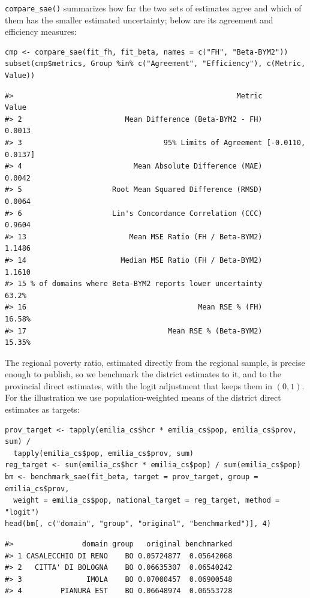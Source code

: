 \texttt{compare\_sae()} summarizes how far the two sets of estimates agree and which of them has the smaller estimated uncertainty; below are its agreement and efficiency measures:

\begin{verbatim}
cmp <- compare_sae(fit_fh, fit_beta, names = c("FH", "Beta-BYM2"))
subset(cmp$metrics, Group %in% c("Agreement", "Efficiency"), c(Metric, Value))
\end{verbatim}

\begin{verbatim}
#>                                                    Metric             Value
#> 2                        Mean Difference (Beta-BYM2 - FH)            0.0013
#> 3                                 95% Limits of Agreement [-0.0110, 0.0137]
#> 4                          Mean Absolute Difference (MAE)            0.0042
#> 5                     Root Mean Squared Difference (RMSD)            0.0064
#> 6                     Lin's Concordance Correlation (CCC)            0.9604
#> 13                        Mean MSE Ratio (FH / Beta-BYM2)            1.1486
#> 14                      Median MSE Ratio (FH / Beta-BYM2)            1.1610
#> 15 % of domains where Beta-BYM2 reports lower uncertainty             63.2%
#> 16                                        Mean RSE % (FH)            16.58%
#> 17                                 Mean RSE % (Beta-BYM2)            15.35%
\end{verbatim}

The regional poverty ratio, estimated directly from the regional sample, is precise enough to publish, so we benchmark the district estimates to it, and to the provincial direct estimates, with the logit adjustment that keeps them in \((0, 1)\). For the illustration we use population-weighted means of the district direct estimates as targets:

\begin{verbatim}
prov_target <- tapply(emilia_cs$hcr * emilia_cs$pop, emilia_cs$prov, sum) /
  tapply(emilia_cs$pop, emilia_cs$prov, sum)
reg_target <- sum(emilia_cs$hcr * emilia_cs$pop) / sum(emilia_cs$pop)
bm <- benchmark_sae(fit_beta, target = prov_target, group = emilia_cs$prov,
  weight = emilia_cs$pop, national_target = reg_target, method = "logit")
head(bm[, c("domain", "group", "original", "benchmarked")], 4)
\end{verbatim}

\begin{verbatim}
#>                domain group   original benchmarked
#> 1 CASALECCHIO DI RENO    BO 0.05724877  0.05642068
#> 2   CITTA' DI BOLOGNA    BO 0.06635307  0.06540242
#> 3               IMOLA    BO 0.07000457  0.06900548
#> 4         PIANURA EST    BO 0.06648974  0.06553728
\end{verbatim}


